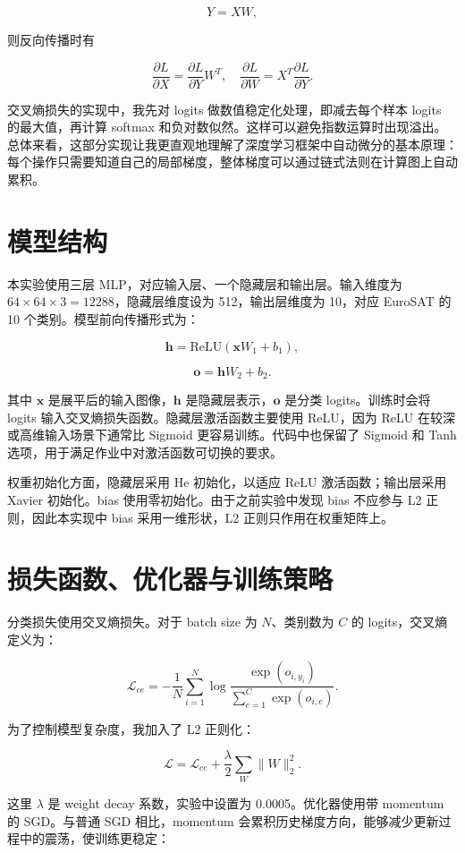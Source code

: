 \documentclass[UTF8,12pt,a4paper]{ctexart}
\begin{document}
\[
Y = XW,
\]

则反向传播时有

\[
\frac{\partial L}{\partial X} = \frac{\partial L}{\partial Y}W^T,
\quad
\frac{\partial L}{\partial W} = X^T\frac{\partial L}{\partial Y}.
\]

交叉熵损失的实现中，我先对 logits 做数值稳定化处理，即减去每个样本 logits 的最大值，再计算 softmax 和负对数似然。这样可以避免指数运算时出现溢出。总体来看，这部分实现让我更直观地理解了深度学习框架中自动微分的基本原理：每个操作只需要知道自己的局部梯度，整体梯度可以通过链式法则在计算图上自动累积。

\section{模型结构}

本实验使用三层 MLP，对应输入层、一个隐藏层和输出层。输入维度为 $64 \times 64 \times 3 = 12288$，隐藏层维度设为 512，输出层维度为 10，对应 EuroSAT 的 10 个类别。模型前向传播形式为：

\[
\mathbf{h} = \mathrm{ReLU}(\mathbf{x}W_1 + b_1),
\]

\[
\mathbf{o} = \mathbf{h}W_2 + b_2.
\]

其中 $\mathbf{x}$ 是展平后的输入图像，$\mathbf{h}$ 是隐藏层表示，$\mathbf{o}$ 是分类 logits。训练时会将 logits 输入交叉熵损失函数。隐藏层激活函数主要使用 ReLU，因为 ReLU 在较深或高维输入场景下通常比 Sigmoid 更容易训练。代码中也保留了 Sigmoid 和 Tanh 选项，用于满足作业中对激活函数可切换的要求。

权重初始化方面，隐藏层采用 He 初始化，以适应 ReLU 激活函数；输出层采用 Xavier 初始化。bias 使用零初始化。由于之前实验中发现 bias 不应参与 L2 正则，因此本实现中 bias 采用一维形状，L2 正则只作用在权重矩阵上。

\section{损失函数、优化器与训练策略}

分类损失使用交叉熵损失。对于 batch size 为 $N$、类别数为 $C$ 的 logits，交叉熵定义为：

\[
\mathcal{L}_{ce} =
-\frac{1}{N}\sum_{i=1}^{N}
\log
\frac{\exp(o_{i,y_i})}
{\sum_{c=1}^{C}\exp(o_{i,c})}.
\]

为了控制模型复杂度，我加入了 L2 正则化：

\[
\mathcal{L} = \mathcal{L}_{ce}
+ \frac{\lambda}{2}\sum_W \|W\|_2^2.
\]

这里 $\lambda$ 是 weight decay 系数，实验中设置为 0.0005。优化器使用带 momentum 的 SGD。与普通 SGD 相比，momentum 会累积历史梯度方向，能够减少更新过程中的震荡，使训练更稳定：
\end{document}
